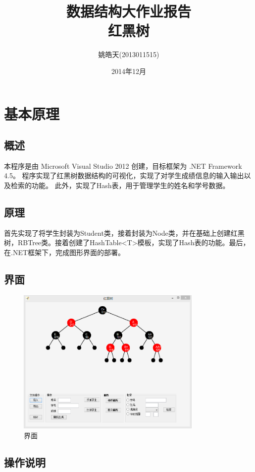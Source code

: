 \documentclass[12pt,a4paper]{article}
\author{姚皓天(2013011515)}
\title{数据结构大作业报告\\红黑树}
\date{2014年12月}
\begin{document}
\maketitle
\thispagestyle{empty}

\newpage
\thispagestyle{empty}
\renewcommand\contentsname{\textbf{目录}}
\tableofcontents

\newpage
\section{基本原理}
\subsection{概述}
本程序是由 Microsoft Visual Studio 2012 创建，目标框架为 .NET Framework 4.5。
程序实现了红黑树数据结构的可视化，实现了对学生成绩信息的输入输出以及检索的功能。
此外，实现了Hash表，用于管理学生的姓名和学号数据。
\subsection{原理}
首先实现了将学生封装为Student类，接着封装为Node类，并在基础上创建红黑树，RBTree类。接着创建了HashTable<T>模板，实现了Hash表的功能。最后，在.NET框架下，完成图形界面的部署。
\subsection{界面}
\begin{figure}[H]
\centering
\includegraphics[width=0.8\textwidth]{2.png}
\caption{界面} 
\end{figure}
\subsection{操作说明}
\end{document}
